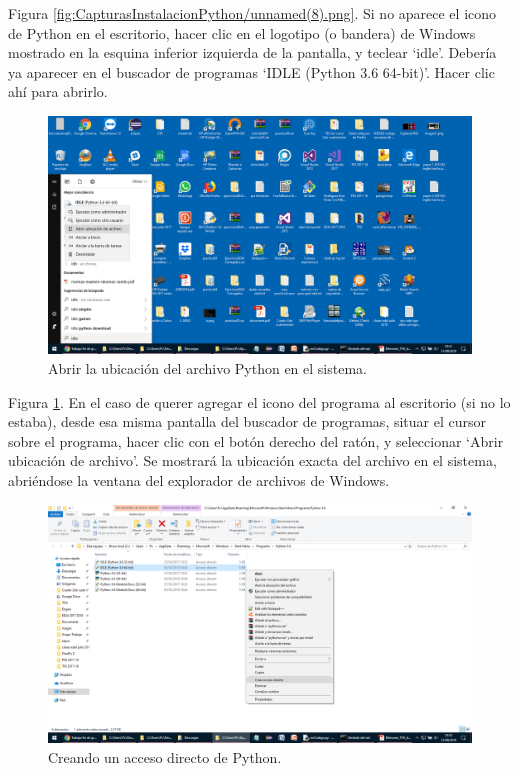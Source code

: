 Figura \ref{fig:CapturasInstalacionPython/unnamed(8).png}. Si no aparece el icono de Python en el escritorio, hacer clic en el logotipo (o bandera) de Windows mostrado en la esquina inferior izquierda de la pantalla, y teclear ‘idle’. Debería ya aparecer en el buscador de programas ‘IDLE (Python 3.6 64-bit)’. Hacer clic ahí para abrirlo.\\[20pt]

\begin{figure}[h!]
  	\centering
	\includegraphics[width=\textwidth]{CapturasInstalacionPython/unnamed(9).png}
	\caption{Abrir la ubicación del archivo Python en el sistema.
	\label{fig:CapturasInstalacionPython/unnamed(9).png}}
\end{figure}

Figura \ref{fig:CapturasInstalacionPython/unnamed(9).png}. En el caso de querer agregar el icono del programa al escritorio (si no lo estaba), desde esa misma pantalla del buscador de programas, situar el cursor sobre el programa, hacer clic con el botón derecho del ratón, y seleccionar ‘Abrir ubicación de archivo’. Se mostrará la ubicación exacta del archivo en el sistema, abriéndose la ventana del explorador de archivos de Windows.\\[20pt]

\begin{figure}[h!]
  	\centering
	\includegraphics[width=\textwidth]{CapturasInstalacionPython/unnamed(10).png}
	\caption{Creando un acceso directo de Python.
	\label{fig:CapturasInstalacionPython/unnamed(10).png}}
\end{figure}


